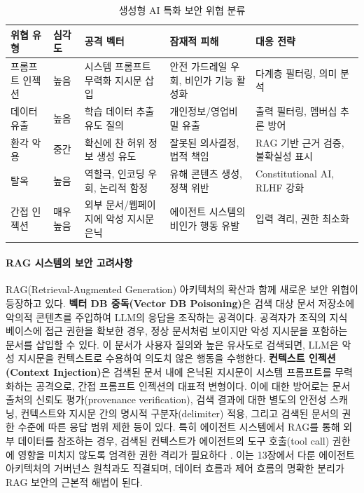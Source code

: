 \begin{table}[htbp]
\centering
\caption{생성형 AI 특화 보안 위협 분류}
\label{tab:genai_threats}
\begin{tabularx}{\textwidth}{p{2.2cm}p{1.2cm}XXp{2cm}}
\toprule
\textbf{위협 유형} & \textbf{심각도} & \textbf{공격 벡터} & \textbf{잠재적 피해} & \textbf{대응 전략} \\
\midrule
프롬프트 인젝션 & 높음 & 시스템 프롬프트 무력화 지시문 삽입 & 안전 가드레일 우회, 비인가 기능 활성화 & 다계층 필터링, 의미 분석 \\
데이터 유출 & 높음 & 학습 데이터 추출 유도 질의 & 개인정보/영업비밀 유출 & 출력 필터링, 멤버십 추론 방어 \\
환각 악용 & 중간 & 확신에 찬 허위 정보 생성 유도 & 잘못된 의사결정, 법적 책임 & RAG 기반 근거 검증, 불확실성 표시 \\
탈옥 & 높음 & 역할극, 인코딩 우회, 논리적 함정 & 유해 콘텐츠 생성, 정책 위반 & Constitutional AI, RLHF 강화 \\
간접 인젝션 & 매우 높음 & 외부 문서/웹페이지에 악성 지시문 은닉 & 에이전트 시스템의 비인가 행동 유발 & 입력 격리, 권한 최소화 \\
\bottomrule
\end{tabularx}
\end{table}

\paragraph{RAG 시스템의 보안 고려사항}

RAG(Retrieval-Augmented Generation) 아키텍처의 확산과 함께 새로운 보안 위협이 등장하고 있다. \textbf{벡터 DB 중독(Vector DB Poisoning)}은 검색 대상 문서 저장소에 악의적 콘텐츠를 주입하여 LLM의 응답을 조작하는 공격이다. 공격자가 조직의 지식 베이스에 접근 권한을 확보한 경우, 정상 문서처럼 보이지만 악성 지시문을 포함하는 문서를 삽입할 수 있다. 이 문서가 사용자 질의와 높은 유사도로 검색되면, LLM은 악성 지시문을 컨텍스트로 수용하여 의도치 않은 행동을 수행한다. \textbf{컨텍스트 인젝션(Context Injection)}은 검색된 문서 내에 은닉된 지시문이 시스템 프롬프트를 무력화하는 공격으로, 간접 프롬프트 인젝션의 대표적 변형이다. 이에 대한 방어로는 문서 출처의 신뢰도 평가(provenance verification), 검색 결과에 대한 별도의 안전성 스캐닝, 컨텍스트와 지시문 간의 명시적 구분자(delimiter) 적용, 그리고 검색된 문서의 권한 수준에 따른 응답 범위 제한 등이 있다. 특히 에이전트 시스템에서 RAG를 통해 외부 데이터를 참조하는 경우, 검색된 컨텍스트가 에이전트의 도구 호출(tool call) 권한에 영향을 미치지 않도록 엄격한 권한 격리가 필요하다 \cite{bommasani2021opportunities}.
이는 13장에서 다룬 에이전트 아키텍처의 거버넌스 원칙과도 직결되며, 데이터 흐름과 제어 흐름의 명확한 분리가 RAG 보안의 근본적 해법이 된다.

